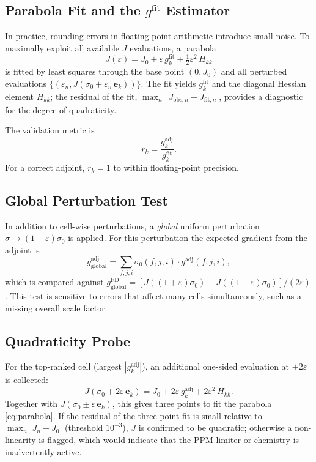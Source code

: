 \documentclass[12pt]{article}
\newcommand{\gfd}{g^{\mathrm{FD}}}
\newcommand{\gadj}{g^{\mathrm{adj}}}
\newcommand{\gfit}{g^{\mathrm{fit}}}
\newcommand{\ek}{\mathbf{e}_k}
\newcommand{\eps}{\varepsilon}
\begin{document}
\subsection{Parabola Fit and the $g^{\mathrm{fit}}$ Estimator}

In practice, rounding errors in floating-point arithmetic introduce small noise.
To maximally exploit all available $J$ evaluations, a parabola
\begin{equation}
  J(\eps) = J_0 + \eps\,\gfit_k + \tfrac{1}{2}\eps^2\,H_{kk}
  \label{eq:parabola}
\end{equation}
is fitted by least squares through the base point $(0, J_0)$ and all
perturbed evaluations $\{(\eps_n, J(\sigma_0 + \eps_n\,\ek))\}$.  The fit
yields $\gfit_k$ and the diagonal Hessian element $H_{kk}$; the residual of
the fit, $\max_n|\,J_{\mathrm{obs},n} - J_{\mathrm{fit},n}|$, provides a
diagnostic for the degree of quadraticity.

The validation metric is
\begin{equation}
  r_k = \frac{\gadj_k}{\gfit_k}.
\end{equation}
For a correct adjoint, $r_k = 1$ to within floating-point precision.

\subsection{Global Perturbation Test}

In addition to cell-wise perturbations, a \emph{global} uniform perturbation
$\sigma \to (1+\eps)\sigma_0$ is applied.  For this perturbation the
expected gradient from the adjoint is
\begin{equation}
  g_{\mathrm{global}}^{\mathrm{adj}} =
  \sum_{f,j,i} \sigma_0(f,j,i)\cdot\gadj(f,j,i),
  \label{eq:g_global}
\end{equation}
which is compared against
$\gfd_{\mathrm{global}} = [J((1+\eps)\sigma_0) - J((1-\eps)\sigma_0)]/(2\eps)$.
This test is sensitive to errors that affect many cells simultaneously, such as
a missing overall scale factor.

\subsection{Quadraticity Probe}

For the top-ranked cell (largest $|\gadj_k|$), an additional one-sided
evaluation at $+2\eps$ is collected:
\begin{equation}
  J(\sigma_0 + 2\eps\,\ek) = J_0 + 2\eps\,\gadj_k + 2\eps^2\,H_{kk}.
\end{equation}
Together with $J(\sigma_0 \pm \eps\,\ek)$, this gives three points to fit the
parabola \eqref{eq:parabola}.  If the residual of the three-point fit is small
relative to $\max_n |J_n - J_0|$ (threshold $10^{-3}$), $J$ is confirmed to
be quadratic; otherwise a non-linearity is flagged, which would indicate that
the PPM limiter or chemistry is inadvertently active.
\end{document}
